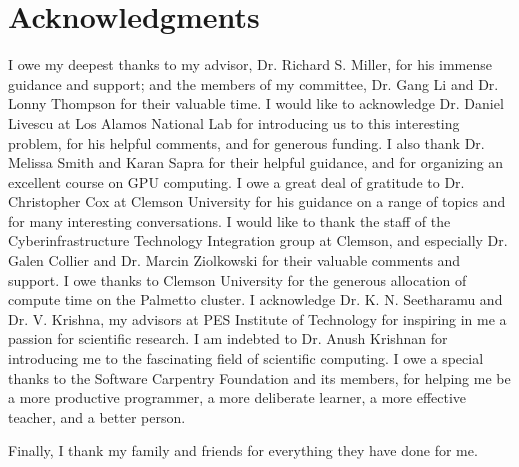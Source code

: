 \chapter*{Acknowledgments}

I owe my deepest thanks
to my advisor, Dr. Richard S. Miller,
for his immense guidance and support;
and the members of my committee,
Dr. Gang Li and Dr. Lonny Thompson
for their valuable time.
I would like to acknowledge
Dr. Daniel Livescu at Los Alamos National Lab
for introducing us to this interesting problem,
for his helpful comments,
and for generous funding.
I also thank
Dr. Melissa Smith and Karan Sapra
for their helpful guidance,
and for organizing an excellent course on GPU computing.
I owe a great deal of gratitude to
Dr. Christopher Cox at Clemson University
for his guidance on a range of topics
and for many interesting conversations.
I would like to thank the
staff of the Cyberinfrastructure Technology Integration group at Clemson,
and especially
Dr. Galen Collier and Dr. Marcin Ziolkowski
for their valuable comments and support.
I owe thanks to Clemson University for the generous
allocation of compute time on the Palmetto cluster.
I acknowledge
Dr. K. N. Seetharamu and Dr. V. Krishna,
my advisors at PES Institute of Technology
for inspiring in me a passion for
scientific research.
I am indebted to Dr. Anush Krishnan
for introducing me to the fascinating field of
scientific computing.
I owe a special thanks to the
Software Carpentry Foundation
and its members,
for helping me be
a more productive programmer,
a more deliberate learner,
a more effective teacher,
and a better person.

Finally, I thank my family and friends
for everything they have done for me.
